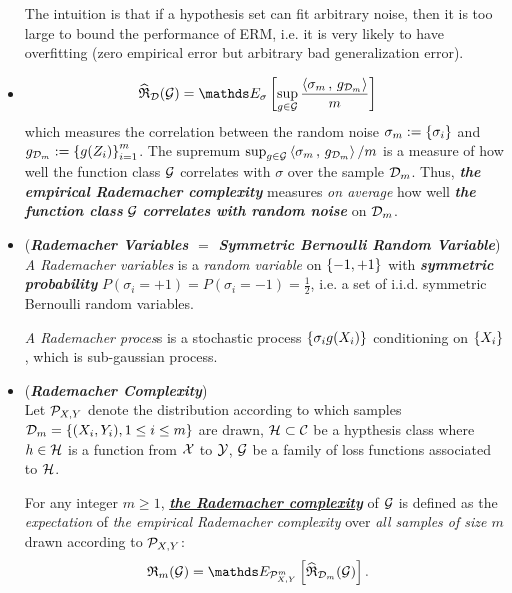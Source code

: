 \documentclass[11pt]{article}
\begin{document}
\begin{itemize}
\begin{remark}
The intuition is that if a hypothesis set can fit arbitrary noise, then it is too large to bound the performance of ERM, i.e. it is very likely to have overfitting (zero empirical error but arbitrary bad generalization error).
\end{remark}

\item \begin{remark}
\begin{align*}
\widehat{\mathfrak{R}}_{\cD}(\cG)&= \E{\sigma}{\sup_{g \in \cG}\frac{\inn{\sigma_m}{g_{\cD_m}}}{m}}
\end{align*} which measures the correlation between the random noise $\sigma_m := \left\{\sigma_i\right\}$ and $g_{{\mathcal D}_m} := \left\{g(Z_i)\right\}_{i=1}^{m}$. The supremum $\sup_{g \in {\mathcal G}} \left\langle \sigma_m\,,\, g_{{\mathcal D}_m} \right\rangle/m$ is a measure of how well the function class ${\mathcal G}$ correlates with $\sigma$ over the sample ${\mathcal D}_m$. Thus, \emph{\textbf{the empirical Rademacher complexity}} measures \emph{on average} how well \emph{\textbf{the function class}} ${\mathcal G}$ \emph{\textbf{correlates with random noise}} on ${\mathcal D}_m$. 
\end{remark}

\item \begin{remark} (\emph{\textbf{Rademacher Variables $=$ Symmetric Bernoulli Random Variable}})\\
\emph{A Rademacher variables} is a \emph{random variable} on $\left\{-1, +1\right\}$ with \emph{\textbf{symmetric probability}} $P(\sigma_i = +1) = P(\sigma_i = -1)= \frac{1}{2}$, i.e. a set of i.i.d. symmetric Bernoulli random variables.

\emph{A Rademacher proces}s is a stochastic process $\left\{\sigma_i g(X_i)\right\}$ conditioning on $\left\{X_i\right\}$, which is sub-gaussian process.
\end{remark}


\item \begin{definition} (\emph{\textbf{Rademacher Complexity}})\\
Let ${\mathcal P}_{X, Y}$ denote the distribution according to which samples ${\mathcal D}_m = \{(X_i, Y_i), 1\le i\le m\}$ are drawn, ${\mathcal H} \subset {\mathcal C}$ be a hypthesis class where $h \in {\mathcal H}$ is a function from ${\mathcal X}$ to ${\mathcal Y}$,  ${\mathcal G}$ be a family of loss functions associated to ${\mathcal H}$. 

For any integer $m \ge 1$, \underline{\emph{\textbf{the Rademacher complexity}}} of ${\mathcal G}$ is defined as the \emph{expectation} of \emph{the empirical
Rademacher complexity} over \emph{all samples of size $m$} drawn according to ${\mathcal P}_{X, Y}$:
\begin{align*}
\frR_{m}(\cG) &= \E{\cP_{X,Y}^{m}}{\widehat{\mathfrak{R}}_{\cD_m}(\cG)}.
\end{align*}
\end{definition}


\end{itemize}
\end{document}
